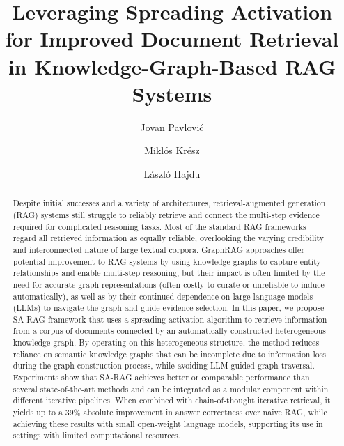 \documentclass{article}
\title{Leveraging Spreading Activation for Improved Document Retrieval in Knowledge-Graph-Based RAG Systems}
\author[2]{
    Jovan Pavlović
}
\author[1,2, 3]{
    Miklós Krész
}
\author[1,2]{
    László Hajdu
}
\affil[1]{
    \textbf{InnoRenew CoE, UP IAM, University of Primorska}
        }
\affil[2]{\textbf{UP FAMNIT, University of Primorska}}
\affil[3]{\textbf{University of Szeged, Department of Applied Informatics}}
\begin{document}
\maketitle
\begin{abstract}
Despite initial successes and a variety of architectures, retrieval-augmented generation (RAG) systems still struggle to reliably retrieve and connect the multi-step evidence required for complicated reasoning tasks. Most of the standard RAG frameworks regard all retrieved information as equally reliable, overlooking the varying credibility and interconnected nature of large textual corpora. GraphRAG approaches offer potential improvement to RAG systems by using knowledge graphs to capture entity relationships and enable multi-step reasoning, but their impact is often limited by the need for accurate graph representations (often costly to curate or unreliable to induce automatically), as well as by their continued dependence on large language models (LLMs) to navigate the graph and guide evidence selection.  In this paper, we propose SA-RAG framework that uses a spreading activation algorithm to retrieve information from a corpus of documents connected by an automatically constructed heterogeneous knowledge graph. By operating on this heterogeneous structure, the method reduces reliance on semantic knowledge graphs that can be incomplete due to information loss during the graph construction process, while avoiding LLM-guided graph traversal. Experiments show that SA-RAG achieves better or comparable performance than several state-of-the-art methods and can be integrated as a modular component within different iterative pipelines. When combined with chain-of-thought iterative retrieval, it yields up to a 39\% absolute improvement in answer correctness over naive RAG, while achieving these results with small open-weight language models, supporting its use in settings with limited computational resources.
\end{abstract}


\end{document}

